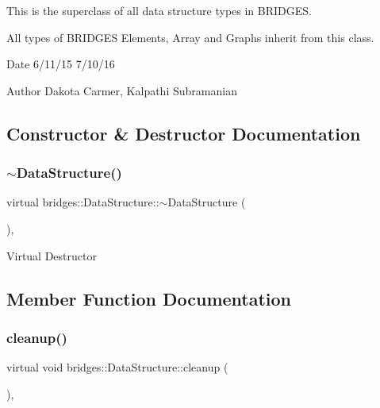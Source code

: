 This is the superclass of all data structure types in B\+R\+I\+D\+G\+ES.

All types of B\+R\+I\+D\+G\+ES Elements, Array and Graphs inherit from this class.

\begin{DoxyDate}{Date}
6/11/15 7/10/16 
\end{DoxyDate}
\begin{DoxyAuthor}{Author}
Dakota Carmer, Kalpathi Subramanian 
\end{DoxyAuthor}


\subsection{Constructor \& Destructor Documentation}
\hypertarget{classbridges_1_1_data_structure_afd70a1ae5c2578d80a441714f95f9401}{}\label{classbridges_1_1_data_structure_afd70a1ae5c2578d80a441714f95f9401} 
\subsubsection{\texorpdfstring{$\sim$\+Data\+Structure()}{~DataStructure()}}
{\footnotesize\ttfamily virtual bridges\+::\+Data\+Structure\+::$\sim$\+Data\+Structure (\begin{DoxyParamCaption}{ }\end{DoxyParamCaption})\hspace{0.3cm}{\ttfamily [virtual]}, {\ttfamily [default]}}

Virtual Destructor 

\subsection{Member Function Documentation}
\hypertarget{classbridges_1_1_data_structure_ac3ad75810fd77f0ad35b9b5123d2c8f8}{}\label{classbridges_1_1_data_structure_ac3ad75810fd77f0ad35b9b5123d2c8f8} 
\subsubsection{\texorpdfstring{cleanup()}{cleanup()}}
{\footnotesize\ttfamily virtual void bridges\+::\+Data\+Structure\+::cleanup (\begin{DoxyParamCaption}{ }\end{DoxyParamCaption})\hspace{0.3cm}{\ttfamily [inline]}, {\ttfamily [virtual]}}

